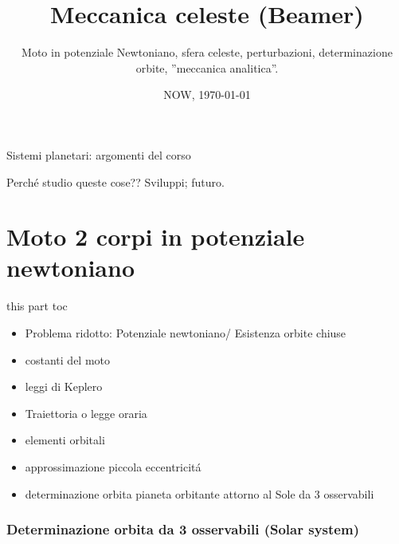 \documentclass[10pt,xcolor={usenames},fleqn,mathserif,serif]{beamer}
\title{Meccanica celeste (Beamer)}
\subtitle{Moto in potenziale Newtoniano, sfera celeste, perturbazioni, determinazione orbite, ''meccanica analitica''.}
\date{NOW, \today}
\begin{document}

\begin{frame}
  \titlepage
\end{frame}


\begin{frame}[allowframebreaks]{Sistemi planetari: argomenti del corso}
\tableofcontents[onlyparts]
\end{frame}

\begin{wordonframe}{Perch\'e studio queste cose?? Sviluppi; futuro.}

\end{wordonframe}

\part{Moto 2 corpi in potenziale newtoniano}
\begin{frame}{this part toc}
\begin{itemize}
\item Problema ridotto: Potenziale newtoniano/ Esistenza orbite chiuse
\item costanti del moto
\item leggi di Keplero
\item Traiettoria o legge oraria
\item elementi orbitali
\item approssimazione piccola eccentricit\'a
\item determinazione orbita pianeta orbitante attorno al Sole da 3 osservabili
\end{itemize}
\end{frame}


\section{Determinazione orbita da 3 osservabili (Solar system)}

\end{document}
